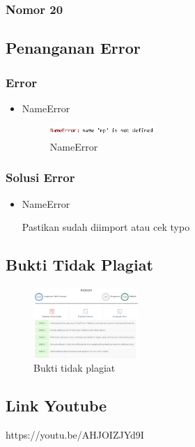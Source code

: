 \subsubsection{Nomor 20}
\hfill\break


\subsection{Penanganan Error}
\subsubsection{Error}
\hfill\break
\begin{itemize}
\item NameError

\begin{figure}[H]
\centering
	\includegraphics[width=4cm]{figures/1174079/7/error.PNG}
\caption{NameError}
\end{figure}
\end{itemize}
\subsubsection{Solusi Error}
\hfill\break
\begin{itemize}
\item NameError

Pastikan sudah diimport atau cek typo
\end{itemize}

\subsection{Bukti Tidak Plagiat}
\begin{figure}[H]
	\includegraphics[width=4cm]{figures/1174079/7/plagiat.PNG}
	\centering
	\caption{Bukti tidak plagiat}
\end{figure}

\subsection{Link Youtube}
https://youtu.be/AHJOIZJYd9I